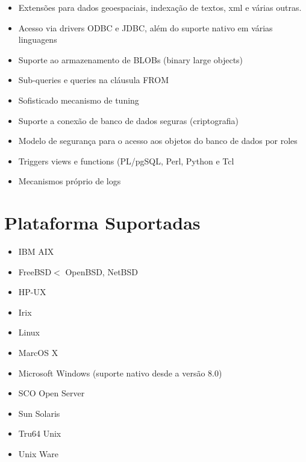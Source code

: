 \begin{itemize}
\item{\bf }Extensões para dados geoespaciais, indexação de textos, xml e várias outras.

\item{\bf }Acesso via drivers ODBC e JDBC, além do suporte nativo em várias linguagens

\item{\bf }Suporte ao armazenamento de BLOBs (binary large objects)

\item{\bf }Sub-queries e queries na cláusula FROM

\item{\bf }Sofisticado mecanismo de tuning

\item{\bf }Suporte a conexão de banco de dados seguras (criptografia)

\item{\bf }Modelo de segurança para o acesso aos objetos do banco de dados por roles

\item{\bf }Triggers views e functions (PL/pgSQL, Perl, Python e Tcl

\item{\bf }Mecanismos próprio de logs
\end{itemize}

\section{Plataforma Suportadas}\setcounter{SteP}{1}

\begin{itemize}
\item{\bf }IBM AIX
\item{\bf }FreeBSD$<$ OpenBSD, NetBSD
\item{\bf }HP-UX
\item{\bf }Irix
\item{\bf }Linux
\item{\bf }MarcOS X
\item{\bf }Microsoft Windows (suporte nativo desde a versão 8.0)
\item{\bf }SCO Open Server
\item{\bf }Sun Solaris
\item{\bf }Tru64 Unix
\item{\bf }Unix Ware
\end{itemize}

